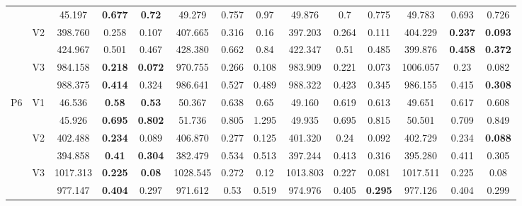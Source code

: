 \documentclass[12pt,a4paper]{article}
\begin{document}
\begin{sidewaystable}[ht]
{\begin{tabular}{cc|ccc|ccc|ccc|ccc|}
   &  & 45.197 & \textbf{0.677} & \textbf{0.72} & 49.279 & 0.757 & 0.97 & 49.876 & 0.7 & 0.775 & 49.783 & 0.693 & 0.726 \\ 
   & \multirow{2}{*}{V2} & 398.760 & 0.258 & 0.107 & 407.665 & 0.316 & 0.16 & 397.203 & 0.264 & 0.111 & 404.229 & \textbf{0.237} & \textbf{0.093} \\ 
   &  & 424.967 & 0.501 & 0.467 & 428.380 & 0.662 & 0.84 & 422.347 & 0.51 & 0.485 & 399.876 & \textbf{0.458} & \textbf{0.372} \\ 
   & \multirow{2}{*}{V3} & 984.158 & \textbf{0.218} & \textbf{0.072} & 970.755 & 0.266 & 0.108 & 983.909 & 0.221 & 0.073 & 1006.057 & 0.23 & 0.082 \\ 
   &  & 988.375 & \textbf{0.414} & 0.324 & 986.641 & 0.527 & 0.489 & 988.322 & 0.423 & 0.345 & 986.155 & 0.415 & \textbf{0.308} \\ 
   \hline \hline\multirow{6}{*}{P6} & \multirow{2}{*}{V1} & 46.536 & \textbf{0.58} & \textbf{0.53} & 50.367 & 0.638 & 0.65 & 49.160 & 0.619 & 0.613 & 49.651 & 0.617 & 0.608 \\ 
   &  & 45.926 & \textbf{0.695} & \textbf{0.802} & 51.736 & 0.805 & 1.295 & 49.935 & 0.695 & 0.815 & 50.501 & 0.709 & 0.849 \\ 
   & \multirow{2}{*}{V2} & 402.488 & \textbf{0.234} & 0.089 & 406.870 & 0.277 & 0.125 & 401.320 & 0.24 & 0.092 & 402.729 & 0.234 & \textbf{0.088} \\ 
   &  & 394.858 & \textbf{0.41} & \textbf{0.304} & 382.479 & 0.534 & 0.513 & 397.244 & 0.413 & 0.316 & 395.280 & 0.411 & 0.305 \\ 
   & \multirow{2}{*}{V3} & 1017.313 & \textbf{0.225} & \textbf{0.08} & 1028.545 & 0.272 & 0.12 & 1013.803 & 0.227 & 0.081 & 1017.511 & 0.225 & 0.08 \\ 
   &  & 977.147 & \textbf{0.404} & 0.297 & 971.612 & 0.53 & 0.519 & 974.976 & 0.405 & \textbf{0.295} & 977.126 & 0.404 & 0.299 \\ 
   \hline
\end{tabular}
}
\end{sidewaystable}
\end{document}
